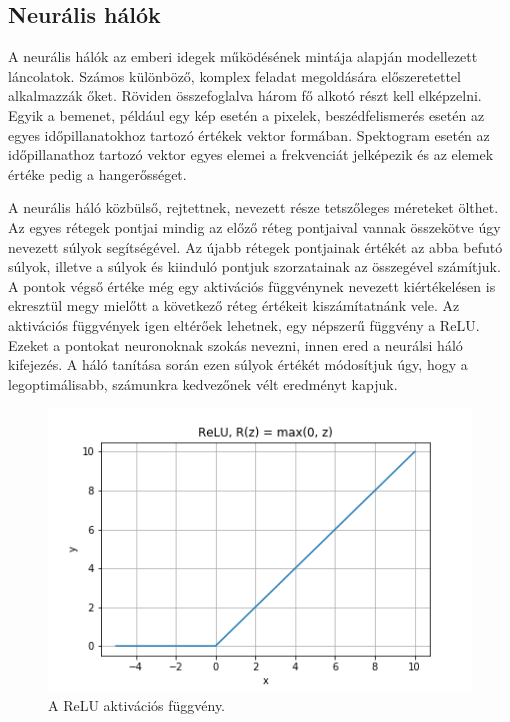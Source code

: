 
\subsection{Neurális hálók}

A neurális hálók az emberi idegek működésének mintája alapján modellezett láncolatok. Számos különböző, komplex feladat megoldására előszeretettel alkalmazzák őket. Röviden összefoglalva három fő alkotó részt kell elképzelni. Egyik a bemenet, például egy kép esetén a pixelek, beszédfelismerés esetén az egyes időpillanatokhoz tartozó értékek vektor formában. Spektogram esetén az időpillanathoz tartozó vektor egyes elemei a frekvenciát jelképezik és az elemek értéke pedig a hangerősséget.

A neurális háló közbülső, rejtettnek, nevezett része tetszőleges méreteket ölthet. Az egyes rétegek pontjai mindig az előző réteg pontjaival vannak összekötve úgy nevezett súlyok segítségével. Az újabb rétegek pontjainak értékét az abba befutó súlyok, illetve a súlyok és kiinduló pontjuk szorzatainak az összegével számítjuk. A pontok végső értéke még egy aktivációs függvénynek nevezett kiértékelésen is ekresztül megy mielőtt a következő réteg értékeit kiszámítatnánk vele. Az aktivációs függvények igen eltérőek lehetnek, egy népszerű függvény a ReLU. Ezeket a pontokat neuronoknak szokás nevezni, innen ered a neurálsi háló kifejezés. A háló tanítása során ezen súlyok értékét módosítjuk úgy, hogy a legoptimálisabb, számunkra kedvezőnek vélt eredményt kapjuk.

\begin{figure}[!ht]
\centering
\includegraphics[width=150mm, keepaspectratio]{figures/ReLU.png}
\caption{A ReLU aktivációs függvény.}
\label{fig:TeXstudio}
\end{figure}

